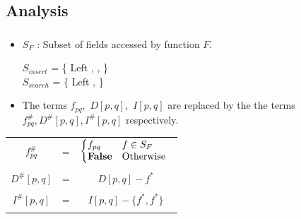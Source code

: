 \documentclass[mathserif,10pt]{beamer}
\newcommand{\p}{\ensuremath{p}}
\newcommand{\q}{\ensuremath{q}}
\newcommand{\f}{\ensuremath{f}}
\newcommand{\fields}{\ensuremath{\mathcal{F}}}
\newcommand{\false}{\textbf{False}}
\newcommand{\project}[2]{\ensuremath{#1\triangleright\!\!#2}}
\begin{document}
\subsection{Analysis}
\frame
{
  \frametitle{\subsecname}

    \begin{itemize}
     \item $S_{F}$ : Subset of fields accessed by function $F$.
      \begin{center}
      $S_{insert}$ = \{ Left , {} , {} \} \\
      $S_{search}$ = \{ Left , {} \} \\ 
      \end{center}

\pause
      \item The terms $f_{\p\q}$,\ $D[\p, \q]$,\ $I[\p, \q]$ are replaced by the the terms $f_{\p\q}^{\#} , {D^{\#}[p,q]} ,{I^{\#}[p,q]}$ respectively.             
   \end{itemize}
   

\begin{center}
\begin{tabular}{ccc}
$f_{\p\q}^{\#}$ & = & $\left \{ \begin{array}{@{}ll}
                       f_{\p\q}  & \f \in S_F  \\
			 \false & \mbox{Otherwise}
                       \end{array} \right.$ \\ \\
$D^{\#}[\p, \q]$ & = & $D[\p, \q] - \f^{*} $ \\ \\
$I^{\#}[\p, \q]$ & = & $I[\p, \q] - \{ \f^{*}, \f^{*} \}$ \\ \\
\end{tabular}
\end{center}



}
\end{document}
